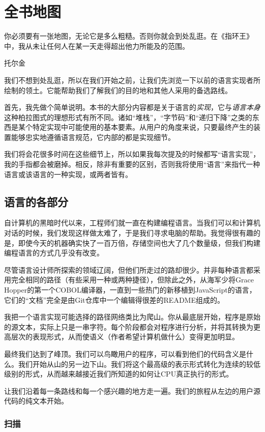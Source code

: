 \documentclass[cn,11pt,chinese]{elegantbook}
\begin{document}
\chapter{全书地图}

\epigraph{你必须要有一张地图，无论它是多么粗糙。否则你就会到处乱逛。在《指环王》中，我从未让任何人在某一天走得超出他力所能及的范围。}{托尔金}

我们不想到处乱逛，所以在我们开始之前，让我们先浏览一下以前的语言实现者所绘制的领土。它能帮助我们了解我们的目的地和其他人采用的备选路线。

首先，我先做个简单说明。本书的大部分内容都是关于语言的\textit{实现}，它与\textit{语言本身}这种柏拉图式的理想形式有所不同。诸如“堆栈”，“字节码”和“递归下降”之类的东西是某个特定实现中可能使用的基本要素。从用户的角度来说，只要最终产生的装置能够忠实地遵循语言规范，它内部的都是实现细节。

我们将会花很多时间在这些细节上，所以如果我每次提及的时候都写“语言实现”，我的手指都会被磨掉。相反，除非有重要的区别，否则我将使用“语言”来指代一种语言或该语言的一种实现，或两者皆有。

\section{语言的各部分}

自计算机的黑暗时代以来，工程师们就一直在构建编程语言。当我们可以和计算机对话的时候，我们发现这样做太难了，于是我们寻求电脑的帮助。我觉得很有趣的是，即使今天的机器确实快了一百万倍，存储空间也大了几个数量级，但我们构建编程语言的方式几乎没有改变。

尽管语言设计师所探索的领域辽阔，但他们所走过的路却很少。并非每种语言都采用完全相同的路径（有些采用一种或两种捷径），但除此之外，从海军少将Grace Hopper的第一个COBOL编译器，一直到一些热门的新移植到JavaScript的语言，它们的“文档”完全是由Git仓库中一个编辑得很差的README组成的。

我把一个语言实现可能选择的路径网络类比为爬山。你从最底层开始，程序是原始的源文本，实际上只是一串字符。每个阶段都会对程序进行分析，并将其转换为更高层次的表现形式，从而使语义（作者希望计算机做什么）变得更加明显。

最终我们达到了峰顶。我们可以鸟瞰用户的程序，可以看到他们的代码含义是什么。我们开始从山的另一边下山。我们将这个最高级的表示形式转化为连续的较低级别的形式，从而越来越接近我们所知道的如何让CPU真正执行的形式。

让我们沿着每一条路线和每一个感兴趣的地方走一遍。我们的旅程从左边的用户源代码的纯文本开始。

\subsection{扫描}
\end{document}
